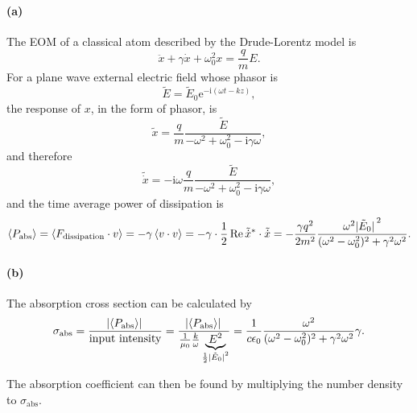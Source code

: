 \documentclass[hyperref, a4paper]{article}
\newcommand*{\ii}{\mathrm{i}}
\newcommand*{\ee}{\mathrm{e}}
\begin{document}
\paragraph{(a)} The EOM of a classical atom described by the Drude-Lorentz model is 
\begin{equation}
    \ddot{x} + \gamma \dot{x} + \omega_0^2 x = \frac{q}{m} E.
\end{equation}
For a plane wave external electric field whose phasor is 
\begin{equation}
    \tilde{E} = \tilde{E}_0 \ee^{- \ii (\omega t - k z)},
\end{equation}
the response of $x$, in the form of phasor, is 
\begin{equation}
    \tilde{x} = \frac{q}{m} \frac{\tilde{E}}{- \omega^2 + \omega_0^2 - \ii \gamma \omega},
    \label{eq:x-e-relation}
\end{equation}
and therefore 
\begin{equation}
    \tilde{\dot{x}} = - \ii \omega \frac{q}{m} \frac{\tilde{E}}{- \omega^2 + \omega_0^2 - \ii \gamma \omega},
\end{equation}
and the time average power of dissipation is 
\begin{equation}
    \expval{P_\text{abs}} = \expval{F_\text{dissipation} \cdot v} 
    = - \gamma \expval{v \cdot v} = - \gamma \cdot \frac{1}{2} \Re \tilde{\dot{x}}^* \cdot \tilde{\dot{x}}
    = - \frac{\gamma q^2}{2 m^2} \frac{\omega^2 \abs*{\tilde{E}_0}^2}{
        (\omega^2 - \omega_0^2)^2 + \gamma^2 \omega^2
    }.
\end{equation}

\paragraph{(b)} The absorption cross section can be calculated by 
\begin{equation}
    \sigma_\text{abs} = \frac{\abs*{\expval{P_\text{abs}}}}{\text{input intensity}}
    = \frac{\abs*{\expval{P_\text{abs}}}}{
        \frac{1}{\mu_0} \frac{k}{\omega} \underbrace{
            E^2
        }_{\frac{1}{2} \abs*{\tilde{E}_0}^2}   
    }
    = \frac{1}{c \epsilon_0} \frac{\omega^2}{
        (\omega^2 - \omega_0^2)^2 + \gamma^2 \omega^2
    } \gamma.
\end{equation}

The absorption coefficient can then be found 
by multiplying the number density to $\sigma_{\text{abs}}$.
\end{document}
